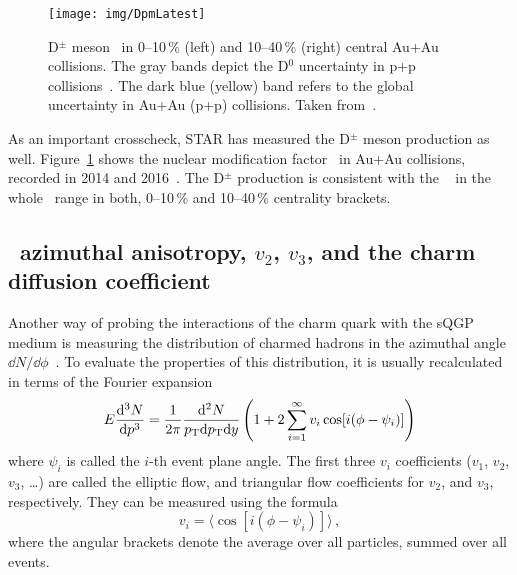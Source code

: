 \begin{figure}[!htb]
\begin{center}
 \texttt{[image: img/DpmLatest]}\\
\end{center}
\caption[D$^\pm$ meson \Raa\ in 0--10$\,\%$ and 10--40$\,\%$ central Au+Au collisions.]{\label{dpm} D$^\pm$ meson \Raa\ in 0--10$\,\%$ (left) and 10--40$\,\%$ (right) central Au+Au collisions. The gray bands depict the D$^0$ uncertainty in p+p collisions~\cite{flashTalkICHEPVanek,D0paper}. The dark blue (yellow) band refers to the global uncertainty in Au+Au (p+p) collisions. Taken from~\cite{flashTalkICHEPVanek}\@.}
\end{figure}


As an important crosscheck, STAR has measured the D$^\pm$ meson production as well. Figure~\ref{dpm} shows the nuclear modification factor \Raa\ in Au+Au collisions, recorded in 2014 and 2016~\cite{flashTalkICHEPVanek,}\@. The D$^\pm$ production is consistent with the \dzero~\cite{D0paper} in the whole \pt\ range in both, 0--10$\,\%$ and 10--40$\,\%$ centrality brackets.

\subsection{\dzero\ azimuthal anisotropy, $v_2$, $v_3$, and the charm diffusion coefficient}

Another way of probing the interactions of the charm quark with the sQGP medium is measuring the distribution of charmed hadrons in the azimuthal angle $\dd N/ \dd \phi$~\cite{StrangeAndChargedv2paper}\@. To evaluate the properties of this distribution, it is usually recalculated in terms of the Fourier expansion
\begin{equation}
E\frac{\mathrm{d}^3 N}{ \mathrm{d} p^3} = \frac{1}{2\pi}\frac{\mathrm{d}^2 N}{{p_{\mathrm{T}}} \mathrm{d} {p_{\mathrm{T}}} \mathrm{d} y} \left(1 + 2\sum_{i=1}^\infty v_i \cos[i(\phi - \psi_i)] \right)
\end{equation}
where $\psi_i$ is called the $i$-th event plane angle. The first three $v_i$ coefficients ($v_1$, $v_2$, $v_3$, \dots) are called the elliptic flow, and triangular flow coefficients for $v_2$, and $v_3$, respectively. They can be measured using the formula
\begin{equation}
v_i = \langle \cos[i(\phi - \psi_i)] \rangle\,,
\end{equation}
where the angular brackets denote the average over all particles, summed over all events.

